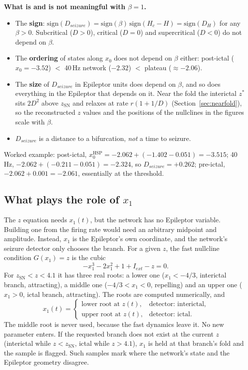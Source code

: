 \documentclass[11pt]{article}
\newcommand{\zsn}{z_{\mathrm{SN}}}
\newcommand{\xh}{x_0^{\mathrm{HSP}}}
\begin{document}
\textbf{What is and is not meaningful with $\beta=1$.}
\begin{itemize}
\item The \textbf{sign}: $\mathrm{sign}(D_{seizure}) = \mathrm{sign}(\beta)\,\mathrm{sign}(H_c-H) = \mathrm{sign}(D_H)$
for any $\beta>0$. Subcritical ($D>0$), critical ($D=0$) and supercritical ($D<0$) do not depend on $\beta$.
\item The \textbf{ordering} of states along $x_0$ does not depend on $\beta$ either: post-ictal ($x_0=-3.52$) $<$ 40\,Hz
network ($-2.32$) $<$ plateau ($\approx-2.06$).
\item The \textbf{size} of $D_{seizure}$ in Epileptor units does depend on $\beta$, and so does everything in the Epileptor
that depends on it. Near the fold the interictal $z^*$ sits $2D^2$ above $\zsn$ and relaxes at rate $r(1+1/D)$
(Section~\ref{sec:nearfold}), so the reconstructed $z$ values and the positions of the nullclines in the figures scale
with $\beta$.
\item $D_{seizure}$ is a distance to a bifurcation, \emph{not} a time to seizure.
\end{itemize}
Worked example: post-ictal, $\xh = -2.062 + (-1.402 - 0.051) = -3.515$; 40\,Hz, $-2.062 + (-0.211-0.051) = -2.324$, so
$D_{seizure} = +0.262$; pre-ictal, $-2.062 + 0.001 = -2.061$, essentially at the threshold.

\subsection{What plays the role of $x_1$}
The $z$ equation needs $x_1(t)$, but the network has no Epileptor variable. Building one from the firing rate would
need an arbitrary midpoint and amplitude. Instead, $x_1$ is the Epileptor's own coordinate, and the network's seizure
detector only chooses the branch. For a given $z$, the fast nullcline condition $G(x_1)=z$ is the cubic
\[
-x_1^3 - 2x_1^2 + 1 + I_{ext} - z = 0 .
\]
For $\zsn < z < 4.1$ it has three real roots: a lower one ($x_1<-4/3$, interictal branch, attracting), a middle one
($-4/3<x_1<0$, repelling) and an upper one ($x_1>0$, ictal branch, attracting). The roots are computed numerically, and
\[
x_1(t) = \begin{cases} \text{lower root at } z(t), & \text{detector: interictal},\\
\text{upper root at } z(t), & \text{detector: ictal.}\end{cases}
\]
The middle root is never used, because the fast dynamics leave it. No new parameter enters. If the requested branch
does not exist at the current $z$ (interictal while $z<\zsn$, ictal while $z>4.1$), $x_1$ is held at that branch's fold
and the sample is flagged. Such samples mark where the network's state and the Epileptor geometry disagree.
\end{document}
